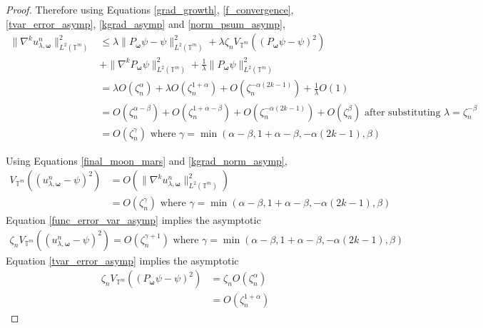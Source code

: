 \documentclass[multixcb]{amstext-l}
\theoremstyle{plain}
\theoremstyle{definition}
\theoremstyle{definition}
\theoremstyle{remark}
\numberwithin{equation}{chapter}
\begin{document}
\begin{proof}
Therefore using Equations \ref{grad_growth}, \ref{f_convergence}, \ref{tvar_error_asymp}, \ref{kgrad_asymp} and \ref{norm_psum_asymp}, \begin{equation}\label{kgrad_norm_asymp}
\begin{aligned}
\|\nabla^ku_{\lambda,\boldsymbol{\omega}}^n\|_{L^2(\mathbb{T}^m)}^2 &\le \lambda\|P_{\boldsymbol{\omega}}\psi-\psi\|^2_{L^2(\mathbb{T}^m)} + \lambda\zeta_n V_{\mathbb{T}^m}((P_{\boldsymbol{\omega}}\psi-\psi)^2)\\
    &+ \|\nabla^kP_{\boldsymbol{\omega}}\psi\|_{L^2(\mathbb{T}^m)}^2 + \frac{1}{\lambda}\|P_{\boldsymbol{\omega}}\psi\|_{L^2(\mathbb{T}^m)}^2\\
    &= \lambda O(\zeta_n^{\alpha}) + \lambda  O(\zeta_n^{1+\alpha}) + O(\zeta_n^{-\alpha(2k-1)}) + \frac{1}{\lambda}O(1)\\
    &= O(\zeta_n^{\alpha-\beta}) + O(\zeta_n^{1+\alpha-\beta}) + O(\zeta_n^{-\alpha(2k-1)}) + O(\zeta_n^{\beta})\mbox{  after substituting }\lambda = \zeta_n^{-\beta}\\
    &= O(\zeta_n^{\gamma}) \mbox{  where   } \gamma = \min(\alpha-\beta,1+\alpha-\beta,-\alpha(2k-1),\beta)
\end{aligned}
\end{equation}


Using Equations \ref{final_moon_mars} and \ref{kgrad_norm_asymp},
\begin{equation}\label{func_error_var_asymp}
\begin{aligned}
V_{\mathbb{T}^m}((u_{\lambda,\boldsymbol{\omega}}^n - \psi)^2) &= O(\|\nabla^ku_{\lambda,\boldsymbol{\omega}}^n\|_{L^2(\mathbb{T}^m)}^2)\\
& = O(\zeta_n^{\gamma}) \mbox{  where   } \gamma = \min(\alpha-\beta,1+\alpha-\beta,-\alpha(2k-1),\beta)
\end{aligned}
\end{equation}
Equation \ref{func_error_var_asymp} implies the asymptotic
\begin{equation}\label{func_error_var_asymp_2}
\begin{aligned}
\zeta_n  V_{\mathbb{T}^m}((u_{\lambda,\boldsymbol{\omega}}^n - \psi)^2) = O(\zeta_n^{\gamma+1}) \mbox{  where   } \gamma = \min(\alpha-\beta,1+\alpha-\beta,-\alpha(2k-1),\beta)
\end{aligned}
\end{equation}
Equation \ref{tvar_error_asymp} implies the asymptotic
\begin{equation}\label{tvar_error_asymp_2}
    \begin{aligned}
      \zeta_n  V_{\mathbb{T}^m}((P_{\boldsymbol{\omega}}\psi-\psi)^2) &= \zeta_n O(\zeta_n^{\alpha})\\
      &= O(\zeta_n^{1+\alpha})
      \end{aligned}
\end{equation}


\end{proof}
\end{document}
